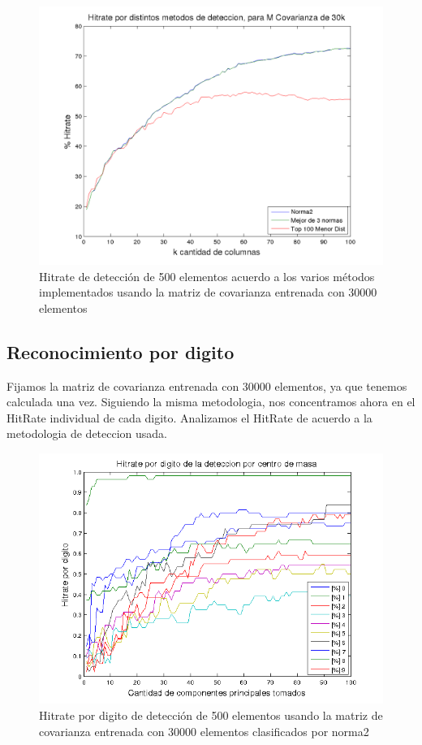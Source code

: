 \begin{figure}[H]
\begin {center}
\includegraphics[width=500pt]{plots/hitrate-30kcv.png}
\end {center}
\caption{Hitrate de detecci\'on de 500 elementos acuerdo a los varios m\'etodos implementados
usando la matriz de covarianza entrenada con 30000 elementos}
\label{fig:HR30kcv}
\end{figure}



\subsection{Reconocimiento por digito}
Fijamos la matriz de covarianza entrenada con 30000 elementos, ya que tenemos calculada una vez.
Siguiendo la misma metodologia, nos concentramos ahora en el HitRate individual
de cada digito. Analizamos el HitRate de acuerdo a la metodologia de deteccion usada.


\begin{figure}[H]
\begin {center}
\includegraphics[width=500pt]{plots/porDig-30kcv-norma2.png}
\end {center}
\caption{Hitrate por digito de detecci\'on de 500 elementos usando la matriz de covarianza entrenada con 30000 elementos
clasificados por norma2}
\label{fig:HRD30kcv-n2}
\end{figure}

